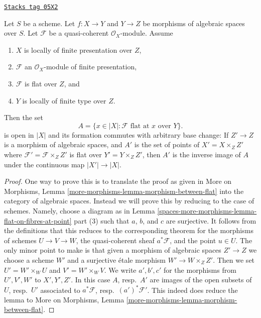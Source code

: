 \begin{lemma}
\label{spaces-more-morphisms-lemma-base-change-criterion-flatness-fibre}
\href{https://stacks.math.columbia.edu/tag/05X2}{\texttt{Stacks tag 05X2}}

Let $S$ be a scheme. Let $f : X \to Y$ and $Y \to Z$ be morphisms of
algebraic spaces over $S$. Let $\mathcal{F}$ be a quasi-coherent
$\mathcal{O}_X$-module.
Assume
\begin{enumerate}
\item $X$ is locally of finite presentation over $Z$,
\item $\mathcal{F}$ an $\mathcal{O}_X$-module of finite presentation,
\item $\mathcal{F}$ is flat over $Z$, and
\item $Y$ is locally of finite type over $Z$.
\end{enumerate}
Then the set
$$
A = \{x \in |X| : \mathcal{F} \text{ flat at }x \text{ over }Y\}.
$$
is open in $|X|$ and its formation commutes with arbitrary base change:
If $Z' \to Z$ is a morphism of algebraic spaces, and $A'$ is the set of
points of $X' = X \times_Z Z'$ where $\mathcal{F}' = \mathcal{F} \times_Z Z'$
is flat over $Y' = Y \times_Z Z'$, then $A'$ is the inverse image of
$A$ under the continuous map $|X'| \to |X|$.
\end{lemma}

\begin{proof}
One way to prove this is to translate the proof as given in
More on Morphisms, Lemma \ref{more-morphisms-lemma-morphism-between-flat}
into the category of algebraic spaces. Instead we will prove this
by reducing to the case of schemes. Namely, choose a diagram as in
Lemma \ref{spaces-more-morphisms-lemma-flat-on-fibres-at-point} part (3)
such that $a$, $b$, and $c$ are surjective.
It follows from the definitions that this reduces to the
corresponding theorem for the morphisms of schemes
$U \to V \to W$, the quasi-coherent sheaf $a^*\mathcal{F}$,
and the point $u \in U$. The only minor point to make is that
given a morphism of algebraic spaces $Z' \to Z$ we choose a scheme
$W'$ and a surjective \'etale morphism $W' \to W \times_Z Z'$.
Then we set $U' = W' \times_W U$ and $V' = W' \times_W V$.
We write $a', b', c'$ for the morphisms from $U', V', W'$ to
$X', Y', Z'$. In this case $A$, resp.\ $A'$ are images of the open
subsets of $U$, resp.\ $U'$ associated to
$a^*\mathcal{F}$, resp.\ $(a')^*\mathcal{F}'$.
This indeed does reduce the lemma to
More on Morphisms, Lemma \ref{more-morphisms-lemma-morphism-between-flat}.
\end{proof}

